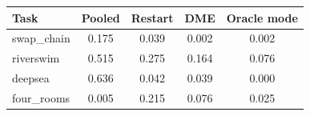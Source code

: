 \begin{tabular}{lcccc}
\toprule
Task & Pooled & Restart & DME & Oracle mode \\
\midrule
swap\_chain & 0.175 & 0.039 & 0.002 & 0.002 \\
riverswim & 0.515 & 0.275 & 0.164 & 0.076 \\
deepsea & 0.636 & 0.042 & 0.039 & 0.000 \\
four\_rooms & 0.005 & 0.215 & 0.076 & 0.025 \\
\bottomrule
\end{tabular}
